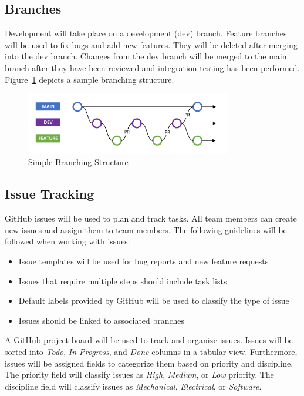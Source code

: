 \documentclass[titlepage]{article}
\begin{document}
\subsection{Branches}

Development will take place on a development (dev) branch. Feature branches will be used to fix bugs and add new features. They will be deleted after merging into the dev branch.  Changes from the dev branch will be merged to the main branch after they have been reviewed and integration testing has been performed. Figure~\ref{fig:Branches} depicts a sample branching structure.

\begin{figure} [H]
\begin{center}
	\includegraphics [width=0.8\textwidth] {Figures/GitHub Branches.pdf}
	\caption{Simple Branching Structure}
	\label{fig:Branches}
	\end{center}
\end{figure}

\subsection{Issue Tracking}

GitHub issues will be used to plan and track tasks. All team members can create new issues and assign them to team members. The following guidelines will be followed when working with issues:

\begin{itemize}
\item Issue templates will be used for bug reports and new feature requests
\item Issues that require multiple steps should include task lists
\item Default labels provided by GitHub will be used to classify the type of issue
\item Issues should be linked to associated branches
\end{itemize}

A GitHub project board will be used to track and organize issues. Issues will be sorted into \textit{Todo}, \textit{In Progress}, and \textit{Done} columns in a tabular view. Furthermore, issues will be assigned fields to categorize them based on priority and discipline. The priority field will classify issues as \textit{High}, \textit{Medium}, or \textit{Low} priority. The discipline field will classify issues as \textit{Mechanical}, \textit{Electrical}, or \textit{Software}.
\end{document}
